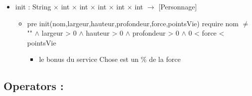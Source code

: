 \documentclass[11pt]{article}
\begin{document}
\subsubsection{}

\begin{itemize}

\item init : String $\times$ int $\times$ int $\times$ int $\times$ int $\times$ int $\to$ [Personnage]\\
\label{sec-1.5.1.1}

\begin{itemize}

\item pre init(nom,largeur,hauteur,profondeur,force,pointsVie) require nom $\neq$ "" $\wedge$ largeur > 0 $\wedge$ hauteur > 0 $\wedge$ profondeur > 0 $\wedge$ 0 < force < pointsVie\\
\label{sec-1.5.1.1.1}

\begin{itemize}

\item le bonus du service Chose est un \% de la force\\
\label{sec-1.5.1.1.1.1}


\end{itemize} %
\end{itemize} %
\end{itemize} %
\subsection{Operators :}
\label{sec-1.6}

\subsubsection{}
\end{document}
